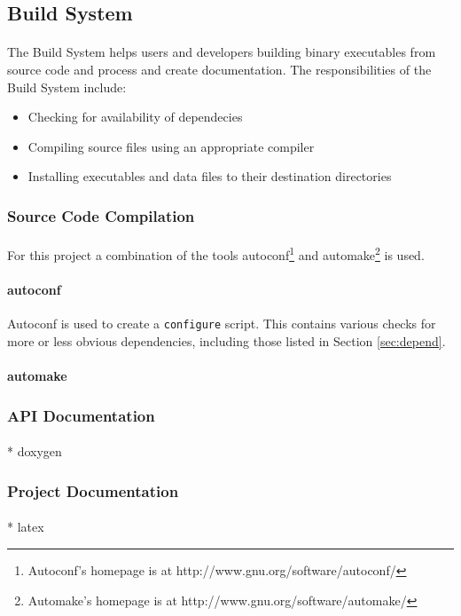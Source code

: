 \subsection{Build System}
\paragraph{}
The Build System helps users and developers building binary executables from source code and process and create documentation. The responsibilities of the Build System include:

\begin{itemize}
\item Checking for availability of dependecies
\item Compiling source files using an appropriate compiler
\item Installing executables and data files to their destination directories
\end{itemize}

\subsubsection{Source Code Compilation}
\paragraph{}

\paragraph{}
For this project a combination of the tools autoconf\footnote{Autoconf's homepage is at http://www.gnu.org/software/autoconf/} and automake\footnote{Automake's homepage is at http://www.gnu.org/software/automake/} is used.

\paragraph{autoconf}
Autoconf is used to create a \texttt{configure} script. This contains various checks for more or less obvious dependencies, including those listed in Section \ref{sec:depend}.

\paragraph{automake}


\subsubsection{API Documentation}
\paragraph{}
* doxygen


\subsubsection{Project Documentation}
\paragraph{}
* latex
